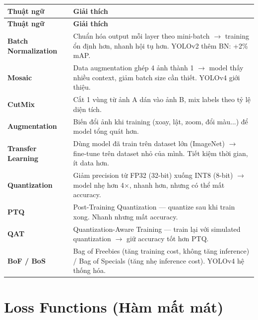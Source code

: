 \begin{longtable}{p{3.5cm}p{12cm}}
\toprule
\textbf{Thuật ngữ} & \textbf{Giải thích} \\
\midrule
\endfirsthead
\toprule
\textbf{Thuật ngữ} & \textbf{Giải thích} \\
\midrule
\endhead

\textbf{Batch Normalization} & Chuẩn hóa output mỗi layer theo mini-batch $\rightarrow$ training ổn định hơn, nhanh hội tụ hơn. YOLOv2 thêm BN: +2\% mAP. \\
\midrule
\textbf{Mosaic} & Data augmentation ghép 4 ảnh thành 1 $\rightarrow$ model thấy nhiều context, giảm batch size cần thiết. YOLOv4 giới thiệu. \\
\midrule
\textbf{CutMix} & Cắt 1 vùng từ ảnh A dán vào ảnh B, mix labels theo tỷ lệ diện tích. \\
\midrule
\textbf{Augmentation} & Biến đổi ảnh khi training (xoay, lật, zoom, đổi màu...) để model tổng quát hơn. \\
\midrule
\textbf{Transfer Learning} & Dùng model đã train trên dataset lớn (ImageNet) $\rightarrow$ fine-tune trên dataset nhỏ của mình. Tiết kiệm thời gian, ít data hơn. \\
\midrule
\textbf{Quantization} & Giảm precision từ FP32 (32-bit) xuống INT8 (8-bit) $\rightarrow$ model nhẹ hơn 4$\times$, nhanh hơn, nhưng có thể mất accuracy. \\
\midrule
\textbf{PTQ} & Post-Training Quantization --- quantize sau khi train xong. Nhanh nhưng mất accuracy. \\
\midrule
\textbf{QAT} & Quantization-Aware Training --- train lại với simulated quantization $\rightarrow$ giữ accuracy tốt hơn PTQ. \\
\midrule
\textbf{BoF / BoS} & Bag of Freebies (tăng training cost, không tăng inference) / Bag of Specials (tăng nhẹ inference cost). YOLOv4 hệ thống hóa. \\
\bottomrule
\end{longtable}

\section*{Loss Functions (Hàm mất mát)}

